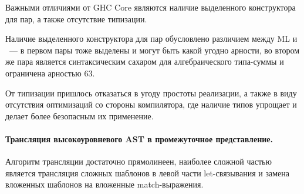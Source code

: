 Важными отличиями от GHC Core являются наличие выделенного конструктора для пар, а также отсутствие типизации.

Наличие выделенного конструктора для пар обусловлено различием между ML и \Haskell{}~--- в первом пары тоже выделены и могут быть какой угодно арности, во втором же пара является синтаксическим сахаром для алгебраического типа-суммы и ограничена арностью 63.

От типизации пришлось отказаться в угоду простоты реализации, а также в виду отсутствия оптимизаций со стороны компилятора, где наличие типов упрощает и делает более безопасным их применение.

\paragraph{Трансляция высокоуровневого AST в промежуточное представление.}

Алгоритм трансляции достаточно прямолинеен, наиболее сложной частью является трансляция сложных шаблонов в левой части let-связывания и замена вложенных шаблонов на вложенные match-выражения.
